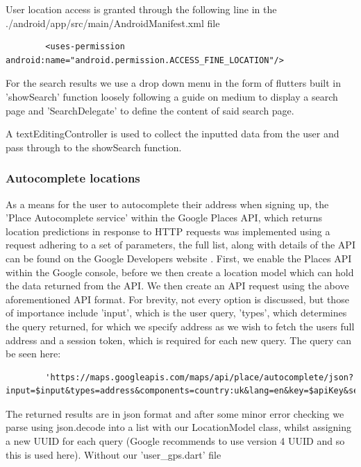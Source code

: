\documentclass[12pt]{article}
\begin{document}
	User location access is granted through the following line in the ./android/app/src/main/AndroidManifest.xml file
	\begin{lstlisting}
		<uses-permission android:name="android.permission.ACCESS_FINE_LOCATION"/>
	\end{lstlisting}
	For the search results we use a drop down menu in the form of flutters built in 'showSearch' function loosely following a guide on medium \cite{sheanLocationSearchAutocomplete2020} to display a search page and 'SearchDelegate' to define the content of said search page.
	
	A textEditingController is used to collect the inputted data from the user and pass through to the showSearch function.
	
	\noindent
	
	
	
	\subsubsection{Autocomplete locations}
	As a means for the user to autocomplete their address when signing up, the 'Place Autocomplete service' within the Google Places API, which returns location predictions in response to HTTP requests was implemented using a request adhering to a set of parameters, the full list, along with details of the API can be found on the Google Developers website \cite{PlaceAutocompleteRequests}.
	First, we enable the Places API within the Google console, before we then create a location model which can hold the data returned from the API. We then create an API request using the above aforementioned API format. For brevity, not every option is discussed, but those of importance include 'input', which is the user query, 'types', which determines the query returned, for which we specify address as we wish to fetch the users full address and a session token, which is required for each new query. The query can be seen here:
	\begin{lstlisting}
		'https://maps.googleapis.com/maps/api/place/autocomplete/json?input=$input&types=address&components=country:uk&lang=en&key=$apiKey&sessiontoken=$sessionToken'
	\end{lstlisting}
	The returned results are in json format and after some minor error checking we parse using json.decode into a list with our LocationModel class, whilst assigning a new UUID for each query (Google recommends to use version 4 UUID and so this is used here). Without our 'user\_gps.dart' file
	
\end{document}
